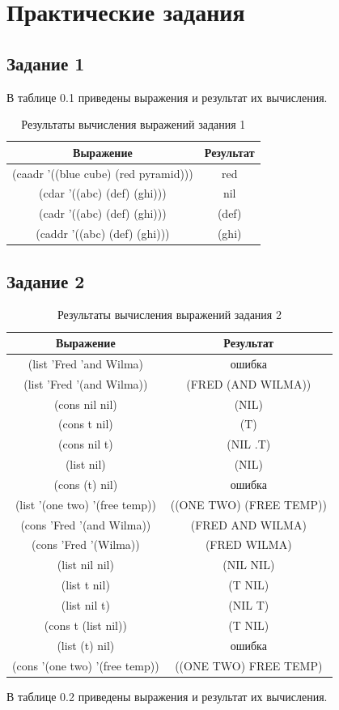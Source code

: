 \chapter{Практические задания}

\section{Задание 1}
В таблице 0.1 приведены выражения и результат их вычисления.
\begin{table}[H]
    \centering
    \caption{Результаты вычисления выражений задания \No{}1}
	\begin{tabular}{|c|c|}
 	\hline
    Выражение & Результат \\
 	\hline
 	(caadr '((blue cube) (red pyramid))) & red \\
 	\hline
 	(cdar '((abc) (def) (ghi))) & nil \\
 	\hline
    (cadr '((abc) (def) (ghi))) & (def) \\
 	\hline
    (caddr '((abc) (def) (ghi))) & (ghi) \\
 	\hline
	\end{tabular}
\end{table}

\section{Задание 2}
\begin{table}[H]
    \centering
    \caption{Результаты вычисления выражений задания \No{}2}
	\begin{tabular}{|c|c|}
 	\hline
    Выражение & Результат \\
 	\hline
 	(list 'Fred 'and Wilma) & ошибка \\
 	\hline
    (list 'Fred '(and Wilma)) & (FRED (AND WILMA))\\
 	\hline
    (cons nil nil) & (NIL) \\
 	\hline
    (cons t nil) & (T) \\
 	\hline
    (cons nil t) & (NIL .T)\\
 	\hline
    (list nil) & (NIL) \\
 	\hline
    (cons (t) nil) & ошибка \\
 	\hline
    (list '(one two) '(free temp)) & ((ONE TWO) (FREE TEMP)) \\
 	\hline
    (cons 'Fred '(and Wilma)) & (FRED AND WILMA) \\
 	\hline
    (cons 'Fred '(Wilma)) & (FRED WILMA) \\
 	\hline
    (list nil nil) & (NIL NIL) \\
 	\hline
    (list t nil) & (T NIL) \\
 	\hline
    (list nil t) & (NIL T) \\
 	\hline
    (cons t (list nil)) & (T NIL) \\
 	\hline
    (list (t) nil) & ошибка \\
 	\hline
    (cons '(one two) '(free temp)) & ((ONE TWO) FREE TEMP) \\
 	\hline
	\end{tabular}
\end{table}
В таблице 0.2 приведены выражения и результат их вычисления.

